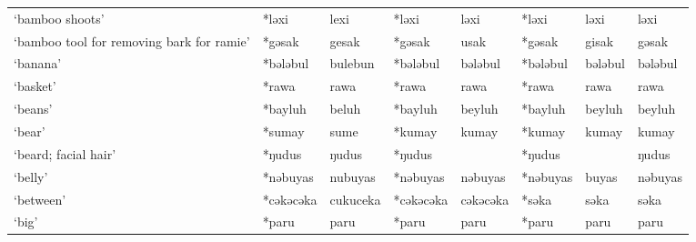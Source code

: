 \begin{landscape}
\begin{longtable}[c]{@{}p{3cm}<{\raggedright}p{2.75cm}<{\raggedright}p{2.75cm}<{\raggedright}p{2.75cm}<{\raggedright}p{2.75cm}<{\raggedright}p{2.75cm}<{\raggedright}p{2.75cm}<{\raggedright}p{2.75cm}<{\raggedright}@{}}
`bamboo shoots'                                      & *ləxi        & lexi                          & *ləxi          & ləxi                       & *ləxi            & ləxi                     & ləxi                              \\
`bamboo tool for removing bark for ramie'            & *gəsak       & gesak                         & *gəsak         & usak                       & *gəsak           & gisak                    & gəsak                             \\
`banana'                                             & *bələbul     & bulebun                       & *bələbul       & bələbul                    & *bələbul         & bələbul                  & bələbul                           \\
`basket'                                             & *rawa        & rawa                          & *rawa          & rawa                       & *rawa            & rawa                     & rawa                              \\
`beans'                                              & *bayluh      & beluh                         & *bayluh        & beyluh                     & *bayluh          & beyluh                   & beyluh                            \\
`bear'                                               & *sumay       & sume                          & *kumay         & kumay                      & *kumay           & kumay                    & kumay                             \\
`beard; facial hair'                                 & *ŋudus       & ŋudus                         & *ŋudus         &                            & *ŋudus           &                          & ŋudus                             \\
`belly'                                              & *nəbuyas     & nubuyas                       & *nəbuyas       & nəbuyas                    & *nəbuyas         & buyas                    & nəbuyas                           \\
`between'                                            & *cəkəcəka    & cukuceka                      & *cəkəcəka      & cəkəcəka                   & *səka            & səka                     & səka                              \\
`big'                                                & *paru        & paru                          & *paru          & paru                       & *paru            & paru                     & paru                              \\

\end{longtable}
\end{landscape}
